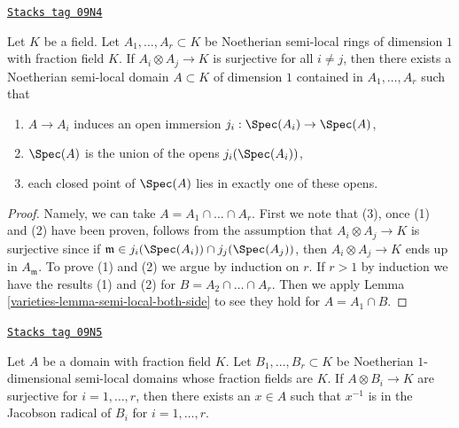 \begin{lemma}
\label{varieties-lemma-glue-a-bunch-of-local-rings}
\href{https://stacks.math.columbia.edu/tag/09N4}{\texttt{Stacks tag 09N4}}

Let $K$ be a field. Let $A_1, \ldots, A_r \subset K$ be Noetherian
semi-local rings of dimension $1$ with fraction field $K$. If
$A_i \otimes A_j \to K$ is surjective for all $i \not = j$, then
there exists a Noetherian semi-local domain $A \subset K$
of dimension $1$ contained in $A_1, \ldots, A_r$ such that
\begin{enumerate}
\item $A \to A_i$ induces an open immersion $j_i : \Spec(A_i) \to \Spec(A)$,
\item $\Spec(A)$ is the union of the opens $j_i(\Spec(A_i))$,
\item each closed point of $\Spec(A)$ lies in exactly one of these
opens.
\end{enumerate}
\end{lemma}

\begin{proof}

Namely, we can take $A = A_1 \cap \ldots \cap A_r$. First we note that (3),
once (1) and (2) have been proven, follows from the assumption that
$A_i \otimes A_j \to K$ is surjective since if
$\mathfrak m \in j_i(\Spec(A_i)) \cap j_j(\Spec(A_j))$, then
$A_i \otimes A_j \to K$ ends up in $A_\mathfrak m$.
To prove (1) and (2) we argue by induction on $r$.
If $r > 1$ by induction we have the results (1) and (2) for
$B = A_2 \cap \ldots \cap A_r$. Then we apply
Lemma \ref{varieties-lemma-semi-local-both-side} to see they hold for
$A = A_1 \cap B$.
\end{proof}

\begin{lemma}
\label{varieties-lemma-create-globally-generated}
\href{https://stacks.math.columbia.edu/tag/09N5}{\texttt{Stacks tag 09N5}}

Let $A$ be a domain with fraction field $K$. Let $B_1, \ldots, B_r \subset K$
be Noetherian $1$-dimensional semi-local domains whose fraction
fields are $K$. If $A \otimes B_i \to K$ are surjective for $i = 1, \ldots, r$,
then there exists an $x \in A$ such that $x^{-1}$ is in the Jacobson radical of
$B_i$ for $i = 1, \ldots, r$.
\end{lemma}

